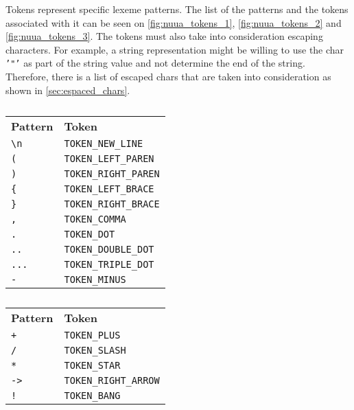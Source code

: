 Tokens represent specific lexeme patterns. The list of the patterns and the tokens associated with it can be seen on \autoref{fig:nuua_tokens_1},
\autoref{fig:nuua_tokens_2} and \autoref{fig:nuua_tokens_3}. The tokens must also take into consideration escaping characters. For example, a string
representation might be willing to use the char \texttt{'"'} as part of the string value and not determine the end of the string. Therefore, there
is a list of escaped chars that are taken into consideration as shown in \autoref{sec:espaced_chars}.

\begin{table}[H]
	\centering
	\begin{subtable}{0.45\textwidth}
		\centering
        \begin{tabular}{ l l }
            \textbf{Pattern} & \textbf{Token} \\
            \texttt{\textbackslash n} & \texttt{TOKEN\_NEW\_LINE} \\
            \texttt{(} & \texttt{TOKEN\_LEFT\_PAREN} \\
            \texttt{)} & \texttt{TOKEN\_RIGHT\_PAREN} \\
            \texttt{\{} & \texttt{TOKEN\_LEFT\_BRACE} \\
            \texttt{\}} & \texttt{TOKEN\_RIGHT\_BRACE} \\
            \texttt{,} & \texttt{TOKEN\_COMMA} \\
            \texttt{.} & \texttt{TOKEN\_DOT} \\
            \texttt{..} & \texttt{TOKEN\_DOUBLE\_DOT} \\
            \texttt{...} & \texttt{TOKEN\_TRIPLE\_DOT} \\
            \texttt{-} & \texttt{TOKEN\_MINUS} \\
		\end{tabular}
		\caption{}
	\end{subtable}
	\begin{subtable}{0.45\textwidth}
		\centering
        \begin{tabular}{ l l }
            \textbf{Pattern} & \textbf{Token} \\
            \texttt{+} & \texttt{TOKEN\_PLUS} \\
            \texttt{/} & \texttt{TOKEN\_SLASH} \\
            \texttt{*} & \texttt{TOKEN\_STAR} \\
            \texttt{->} & \texttt{TOKEN\_RIGHT\_ARROW} \\
            \texttt{!} & \texttt{TOKEN\_BANG} \\

\end{tabular}
\end{subtable}
\end{table}
